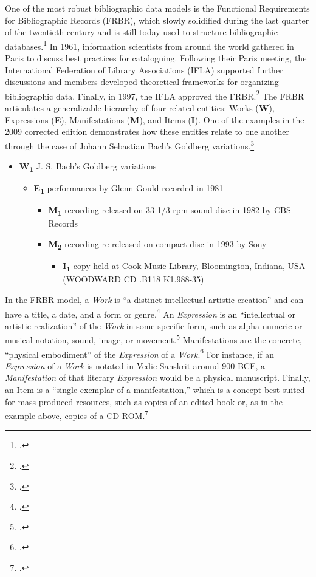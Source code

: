 One of the most robust bibliographic data models is the Functional Requirements for Bibliographic Records (FRBR), which slowly solidified during the last quarter of the twentieth century and is still today used to structure bibliographic databases.\footcite[][]{FRBR_Worldcat} In 1961, information scientists from around the world gathered in Paris to discuss best practices for cataloguing. Following their Paris meeting, the International Federation of Library Associations (IFLA) supported further discussions and members developed theoretical frameworks for organizing bibliographic data. Finally, in 1997, the IFLA approved the FRBR.\footcite{FRBR_1998} The FRBR articulates a generalizable hierarchy of four related entities: Works (\textbf{W}), Expressions (\textbf{E}), Manifestations (\textbf{M}), and Items (\textbf{I}). One of the examples in the 2009 corrected edition demonstrates how these entities relate to one another through the case of Johann Sebastian Bach's Goldberg variations.\footcite[We have augmented the example by adding an Item.][58]{FRBR_2009}

\begin{itemize}
    \item \textbf{W\textsubscript{1}} J. S. Bach's Goldberg variations
    \begin{itemize}
        \item \textbf{E\textsubscript{1}} performances by Glenn Gould recorded in 1981
        \begin{itemize}
            \item \textbf{M\textsubscript{1}} recording released on 33 1/3 rpm sound disc in 1982 by CBS Records
            \item \textbf{M\textsubscript{2}} recording re-released on compact disc in 1993 by Sony
            \begin{itemize}
                \item \textbf{I\textsubscript{1}} copy held at Cook Music Library, Bloomington, Indiana, USA (WOODWARD CD .B118 K1.988-35)
            \end{itemize}
        \end{itemize}
    \end{itemize}
\end{itemize}

In the FRBR model, a \textit{Work} is ``a distinct intellectual artistic creation'' and can have a title, a date, and a form or genre.\footcite[][17]{FRBR_2009} An \textit{Expression} is an ``intellectual or artistic realization'' of the \textit{Work} in some specific form, such as alpha-numeric or musical notation, sound, image, or movement.\footcite[][19]{FRBR_2009} Manifestations are the concrete, ``physical embodiment'' of the \textit{Expression} of a \textit{Work}.\footcite[][21]{FRBR_2009} For instance, if an \textit{Expression} of a \textit{Work} is notated in Vedic Sanskrit around 900 BCE, a \textit{Manifestation} of that literary \textit{Expression} would be a physical manuscript. Finally, an Item is a ``single exemplar of a manifestation,'' which is a concept best suited for mass-produced resources, such as copies of an edited book or, as in the example above, copies of a CD-ROM.\footcite[][24]{FRBR_2009}

% 
